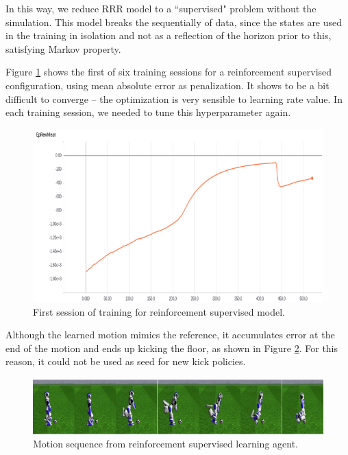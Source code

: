  In this way, we reduce RRR model to a ``supervised" problem without the simulation. This model breaks the sequentially of data, since the states are used in the training in isolation and not as a reflection of the horizon prior to this, satisfying Markov property.

Figure \ref{fig:rlsupcurves} shows the first of six training sessions for a reinforcement supervised configuration, using mean absolute error as penalization. It shows to be a bit difficult to converge -- the optimization is very sensible to learning rate value. In each training session, we needed to tune this hyperparameter again.

\begin{figure}[!htbp]
	\centering
	\includegraphics[scale=1.5]{Cap6/rlsuprewardcurves.eps}
	\caption{First session of training for reinforcement supervised model.}
	\label{fig:rlsupcurves}
\end{figure}

Although the learned motion mimics the reference, it accumulates error at the end of the motion and ends up kicking the floor, as shown in Figure \ref{fig:rlsupmotionsequence}. For this reason, it could not be used as seed for new kick policies.

\begin{figure}[!htbp]
	\centering
	\includegraphics[scale=1.5]{Cap6/rlsupmotionsequence.eps}
	\caption{Motion sequence from reinforcement supervised learning agent.}
	\label{fig:rlsupmotionsequence}
\end{figure}

